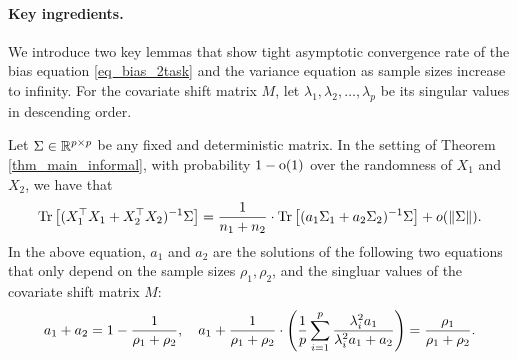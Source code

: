 \paragraph{Key ingredients.}
We introduce two key lemmas that show tight asymptotic convergence rate of the bias equation \eqref{eq_bias_2task} and the variance equation  as sample sizes increase to infinity.
For the covariate shift matrix $M$, let $\lambda_1, \lambda_2, \dots, \lambda_p$ be its singular values in descending order.

\begin{lemma}\label{lem_cov_shift}
	Let $\Sigma \in \mathbb{R}^{p \times p}$ be any fixed and deterministic matrix.
	In the setting of Theorem \ref{thm_main_informal},
	with probability $1-\operatorname{o}(1)$ over the randomness of $X_1$ and $X_2$, we have that %
	\begin{align}\label{lem_cov_shift_eq}
		\bigtr{(X_1^{\top}X_1 + X_2^{\top}X_2)^{-1} \Sigma} = \frac{1}{n_1 + n_2}\cdot \bigtr{ (a_1 \Sigma_1 + a_2\Sigma_2)^{-1} \Sigma} + o(\norm{\Sigma}). %
	\end{align}
	In the above equation, $a_1$ and $a_2$ are the solutions of the following two equations that only depend on the sample sizes $\rho_1, \rho_2$, and the singluar values of the covariate shift matrix $M$:
	\begin{align}
		a_1 + a_2 = 1- \frac{1}{\rho_1 + \rho_2},\quad a_1 + \frac1{\rho_1 + \rho_2}\cdot \left({\frac{1}{p}\sum_{i=1}^p \frac{\lambda_i^2 a_1}{\lambda_i^2 a_1 + a_2}}\right) = \frac{\rho_1}{\rho_1 + \rho_2}. \label{eq_a12extra}
	\end{align}
\end{lemma}


